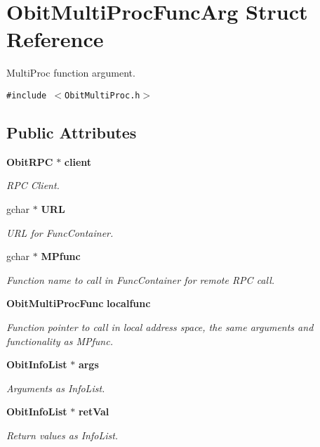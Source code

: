 \section{Obit\-Multi\-Proc\-Func\-Arg Struct Reference}
\label{structObitMultiProcFuncArg}
Multi\-Proc function argument.  


{\tt \#include $<$Obit\-Multi\-Proc.h$>$}

\subsection*{Public Attributes}
\begin{CompactItemize}
\item 
{\bf Obit\-RPC} $\ast$ {\bf client}
\begin{CompactList}\small\item\em RPC Client. \item\end{CompactList}\item 
gchar $\ast$ {\bf URL}
\begin{CompactList}\small\item\em URL for Func\-Container. \item\end{CompactList}\item 
gchar $\ast$ {\bf MPfunc}
\begin{CompactList}\small\item\em Function name to call in Func\-Container for remote RPC call. \item\end{CompactList}\item 
{\bf Obit\-Multi\-Proc\-Func} {\bf localfunc}
\begin{CompactList}\small\item\em Function pointer to call in local address space, the same arguments and functionality as MPfunc. \item\end{CompactList}\item 
{\bf Obit\-Info\-List} $\ast$ {\bf args}
\begin{CompactList}\small\item\em Arguments as Info\-List. \item\end{CompactList}\item 
{\bf Obit\-Info\-List} $\ast$ {\bf ret\-Val}
\begin{CompactList}\small\item\em Return values as Info\-List. \item\end{CompactList}\item 

\end{CompactItemize}
